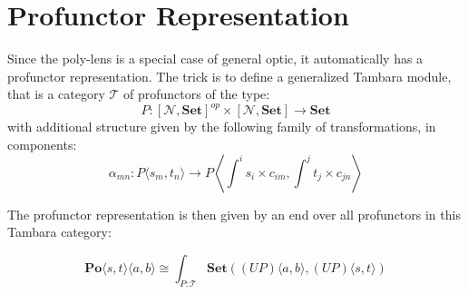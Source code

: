 \documentclass[11pt]{amsart}
\begin{document}
\section{Profunctor Representation}

Since the poly-lens is a special case of general optic, it automatically has a profunctor representation. The trick is to define a generalized Tambara module, that is a category $\mathcal{T}$ of profunctors of the type:
\[ P \colon [\mathcal{N}, \mathbf{Set}]^{op}  \times [\mathcal{N}, \mathbf{Set}] \to \mathbf{Set} \]
with additional structure given by the following family of transformations, in components:
\[\alpha_{m n} \colon P\langle s_m, t_n \rangle \to P \left \langle \int^i s_i \times c_{i m}, \int^j t_j \times c_{j n} \right \rangle \]

The profunctor representation is then given by an end over all profunctors in this Tambara category:

\[  \mathbf{Po}\langle s, t\rangle \langle a, b\rangle \cong \int_{P \colon \mathcal{T}} \mathbf{Set}\left ( (U P)\langle a, b \rangle, (U P) \langle s, t \rangle \right) \]
        
\end{document}
